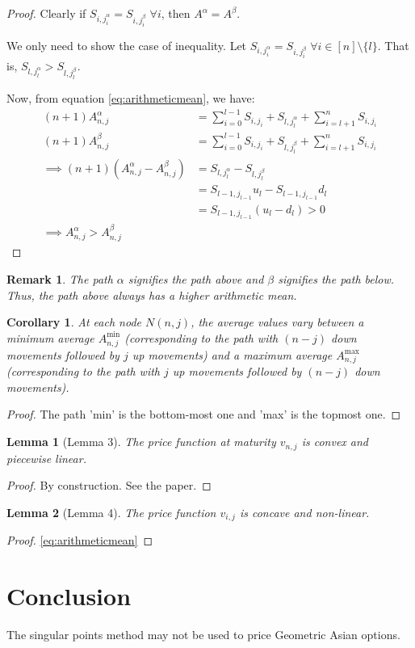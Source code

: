 \documentclass[a4paper]{article}
\numberwithin{equation}{section} %
\numberwithin{figure}{section} %
\numberwithin{table}{section} %
\newtheorem{corr}{Corollary}
\newtheorem{lem}{Lemma}
\newtheorem*{rem}{Remark}
\begin{document}
\begin{proof}
Clearly if $S_{i,j_i^\alpha} = S_{i,j_i^\beta} \; \forall i$, then $A^\alpha = A^\beta$.

We only need to show the case of inequality.
Let $S_{i,j_i^\alpha} = S_{i,j_i^\beta} \; \forall i \in [n] \setminus \{l\}$. That is, $S_{l,j_l^\alpha} > S_{l,j_l^\beta}$.

Now, from equation \ref{eq:arithmeticmean}, we have:
\begin{align*}
(n+1) A_{n,j}^\alpha &= \sum_{i=0}^{l-1} S_{i,j_i} + S_{l,j_l^\alpha} + \sum_{i=l+1}^{n} S_{i,j_i} \\
(n+1) A_{n,j}^\beta &= \sum_{i=0}^{l-1} S_{i,j_i} + S_{l,j_l^\beta} + \sum_{i=l+1}^{n} S_{i,j_i} \\
\implies (n+1) \left(A_{n,j}^\alpha - A_{n,j}^\beta\right) &= S_{l,j_l^\alpha} - S_{l,j_l^\beta} \\
	&= S_{l-1,j_{l-1}} u_l - S_{l-1,j_{l-1}} d_l \\
	&= S_{l-1,j_{l-1}} (u_l - d_l) > 0 \\
\implies A_{n,j}^\alpha > A_{n,j}^\beta
\end{align*}

\end{proof}


\begin{rem}
The path $\alpha$ signifies the path above and $\beta$ signifies the path below. Thus, the path above always has a higher arithmetic mean.
\end{rem}


\begin{corr}
At each node $N(n,j)$, the average values vary between a minimum average $A_{n,j}^{\mathrm{min}}$ (corresponding to the path with $(n-j)$ down movements followed by $j$ up movements) and a maximum average $A_{n,j}^{\mathrm{max}}$ (corresponding to the path with $j$ up movements followed by $(n-j)$ down movements).
\end{corr}

\begin{proof}
The path 'min' is the bottom-most one and 'max' is the topmost one.
\end{proof}


\begin{lem}[Lemma 3]
The price function at maturity $v_{n,j}$ is convex and piecewise linear.
\end{lem}
\begin{proof}
By construction. See the paper.
\end{proof}


\begin{lem}[Lemma 4]
The price function $v_{i,j}$ is concave and non-linear.
\end{lem}
\begin{proof}
\ref{eq:arithmeticmean}

\end{proof}

\section{Conclusion}
The singular points method may not be used to price Geometric Asian options.
\end{document}
